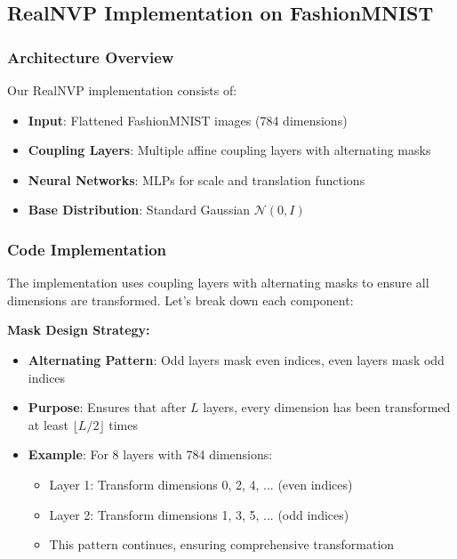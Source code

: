 \documentclass[conference,12pt]{IEEEtran}
\begin{document}
\subsection{RealNVP Implementation on FashionMNIST}

\subsubsection{Architecture Overview}

Our RealNVP implementation consists of:

\begin{itemize}
    \item \textbf{Input}: Flattened FashionMNIST images (784 dimensions)
    \item \textbf{Coupling Layers}: Multiple affine coupling layers with alternating masks
    \item \textbf{Neural Networks}: MLPs for scale and translation functions
    \item \textbf{Base Distribution}: Standard Gaussian $\mathcal{N}(0, I)$
\end{itemize}

\subsubsection{Code Implementation}

The implementation uses coupling layers with alternating masks to ensure all dimensions are transformed. Let's break down each component:

\textbf{Mask Design Strategy:}
\begin{itemize}
    \item \textbf{Alternating Pattern}: Odd layers mask even indices, even layers mask odd indices
    \item \textbf{Purpose}: Ensures that after $L$ layers, every dimension has been transformed at least $\lfloor L/2 \rfloor$ times
    \item \textbf{Example}: For 8 layers with 784 dimensions:
    \begin{itemize}
        \item Layer 1: Transform dimensions 0, 2, 4, ... (even indices)
        \item Layer 2: Transform dimensions 1, 3, 5, ... (odd indices)
        \item This pattern continues, ensuring comprehensive transformation
    \end{itemize}
\end{itemize}
\end{document}
